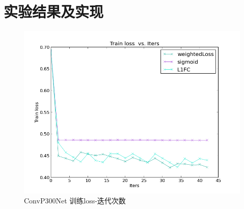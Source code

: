 \section{实验结果及实现}\label{sec:cnn_experiment}



\begin{figure}[htb]
  \centering
  \includegraphics[scale=0.8]{Pictures/CNN/train_loss.png}
  \caption{ConvP300Net 训练loss-迭代次数}\label{fig:train_loss}
\end{figure}









